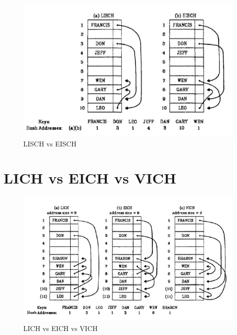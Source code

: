 \documentclass{book}
\begin{document}
\begin{figure}[h]
\begin{center}
\includegraphics[width=12cm]{LISCHvsEISCH.jpg}
\caption{LISCH vs EISCH}
\label{fig:EISCHvsLISCH}
\end{center}
\end{figure}

\section{LICH vs EICH vs VICH}

\begin{figure}[h]
\begin{center}
\includegraphics[width=12cm]{LICHvsEICHvsVICH.jpg}
\caption{LICH vs EICH vs VICH}
\label{fig:LICHvsEICHvsVICH}
\end{center}
\end{figure}
\end{document}
